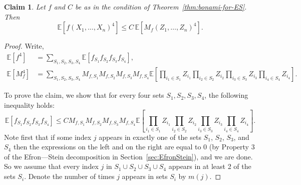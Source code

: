 \documentclass[11pt]{article}
\newcommand {\Exp}       {\mathbb{E}}
\newcommand {\E}     [1] {\Exp\left[#1\right]}
\newtheorem{claim}[theorem]{Claim}
\begin{document}
\begin{claim}\label{claim:fourth-moment}
Let $f$ and $C$ be as in the condition of Theorem~\ref{thm:bonami-for-ES}. Then
$$\E{f(X_1,\dots,X_n)^4} \leq C\, \E{M_f(Z_1,\dots, Z_n)^4}.$$
\end{claim}
\begin{proof}
Write,
\begin{align*}
\E{f^4} &= \sum_{S_1,S_2,S_3,S_4} \E{f_{S_1} f_{S_2} f_{S_3} f_{S_4}},\\
\E{M_f^4} &= \sum_{S_1,S_2,S_3,S_4} M_{f,S_1}M_{f,S_2}M_{f,S_3}M_{f,S_4}
\E{\prod_{i_1\in S_1} Z_{i_1} \prod_{i_2\in S_2} Z_{i_2} \prod_{i_3\in S_3} Z_{i_3} \prod_{i_4\in S_4} Z_{i_4}}.
\end{align*}

To prove the claim, we show that for every four sets $S_1,S_2,S_3,S_4$, the following inequality holds:
\begin{equation}\label{enq:term-by-term}
\E{f_{S_1} f_{S_2} f_{S_3} f_{S_4}} \leq C M_{f,S_1} M_{f,S_2} M_{f,S_3} M_{f,S_4}
\E{\prod_{i_1\in S_1} Z_{i_1} \prod_{i_2\in S_2} Z_{i_2} \prod_{i_3\in S_3} Z_{i_3} \prod_{i_4\in S_4} Z_{i_4}}.
\end{equation}
Note first that if some index $j$ appears in exactly one of the sets $S_1$, $S_2$, $S_3$, and $S_4$ then the expressions on the left and on the right
are equal to $0$ (by Property 3 of the Efron---Stein decomposition in Section~\ref{sec:EfronStein}), and we are done. So we assume that every index $j$ in $S_1 \cup S_2 \cup S_3 \cup S_4$ appears in at least 2 of the sets $S_i$. Denote the number of times $j$ appears in sets $S_i$ by $m(j)$.


\end{proof}
\end{document}
